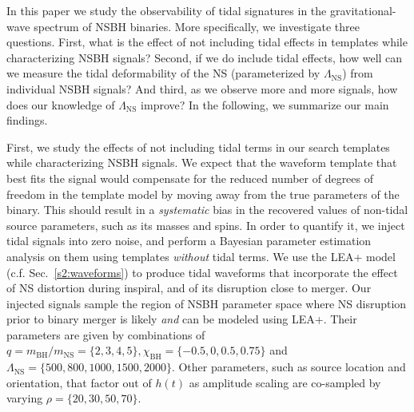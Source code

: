 \documentclass[aps,prd,amsmath,floats,floatfix, twocolumn,
superscriptaddress,nofootinbib,showpacs]{revtex4-1}
\newcommand{\lambdans}{\Lambda_\mathrm{NS}}
\newcommand{\chibh}{\chi_\mathrm{BH}}
\newcommand{\mbh}{m_\mathrm{BH}}
\newcommand{\mns}{m_\mathrm{NS}}
\begin{document}
In this paper we study the observability of tidal signatures in the
gravitational-wave spectrum of NSBH binaries. More specifically, we investigate
three questions. First, what is the effect of not including tidal effects in 
templates while characterizing NSBH signals? Second, if we do include tidal 
effects, how well can we measure the tidal deformability of the NS
(parameterized by $\lambdans$) from individual NSBH signals? And third, as we
observe more and more signals, how does our knowledge of $\lambdans$ improve?
In the following, we summarize our main findings.





First, we study the effects of not including tidal terms in our search
templates while characterizing NSBH signals. We expect that the waveform
template that best fits the signal would compensate for the reduced number of
degrees of freedom in the template model by moving away from the true
parameters of the binary. This should result in a {\it systematic} bias in 
the recovered values of non-tidal source parameters, such as its masses 
and spins. In order to quantify it, we inject tidal signals into zero noise,
and perform a Bayesian parameter estimation analysis on them using templates
{\it without} tidal terms.
% 
We use the LEA+ model (c.f. Sec.~\ref{s2:waveforms}) to produce tidal waveforms
that incorporate the effect
of NS distortion during inspiral, and of its disruption close to merger. Our
injected signals sample the region of NSBH parameter space where NS disruption
prior to binary merger is likely {\it and} can be modeled using LEA+. Their
parameters are given by combinations of $q=\mbh/\mns=\{2,3,4,5\},
\chibh=\{-0.5, 0, 0.5, 0.75\}$ and $\lambdans=\{500,800,1000,1500,2000\}$.
Other parameters, such as source location and orientation, that factor out of
$h(t)$ as amplitude scaling are co-sampled by varying $\rho=\{20,30,50,70\}$.
\end{document}

